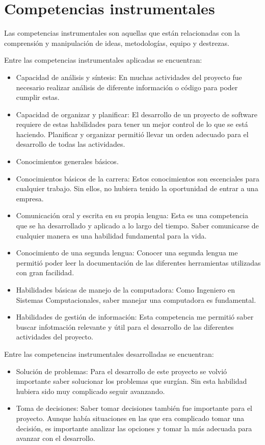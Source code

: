 \section{Competencias instrumentales}
Las competencias instrumentales son aquellas que están relacionadas con la comprensión y manipulación de ideas, metodologías, equipo y destrezas.

Entre las competencias instrumentales aplicadas se encuentran:
    \begin{itemize}
        \item Capacidad de análisis y síntesis: En muchas actividades del proyecto fue necesario realizar análisis de diferente información o código para poder cumplir estas.
        \item Capacidad de organizar y planificar: El desarrollo de un proyecto de software requiere de estas habilidades para tener un mejor control de lo que se está haciendo. Planificar y organizar permitió llevar un orden adecuado para el desarrollo de todas las actividades.
        \item Conocimientos generales básicos.
        \item Conocimientos básicos de la carrera: Estos conocimientos son escenciales para cualquier trabajo. Sin ellos, no hubiera tenido la oportunidad de entrar a una empresa.
        \item Comunicación oral y escrita en su propia lengua: Esta es una competencia que se ha desarrollado y aplicado a lo largo del tiempo. Saber comunicarse de cualquier manera es una habilidad fundamental para la vida.
        \item Conocimiento de una segunda lengua: Conocer una segunda lengua me permitió poder leer la documentación de las diferentes herramientas utilizadas con gran facilidad.
        \item Habilidades básicas de manejo de la computadora: Como Ingeniero en Sistemas Computacionales, saber manejar una computadora es fundamental.
        \item Habilidades de gestión de información: Esta competencia me permitió saber buscar infotmación relevante y útil para el desarrollo de las diferentes actividades del proyecto.
    \end{itemize}

Entre las competencias instrumentales desarrolladas se encuentran:
    \begin{itemize}
        \item Solución de problemas: Para el desarrollo de este proyecto se volvió importante saber solucionar los problemas que surgían. Sin esta habilidad hubiera sido muy complicado seguir avanzando.
        \item Toma de decisiones: Saber tomar decisiones también fue importante para el proyecto. Aunque había situaciones en las que era complicado tomar una decisión, es importante analizar las opciones y tomar la más adecuada para avanzar con el desarrollo.
    \end{itemize}
